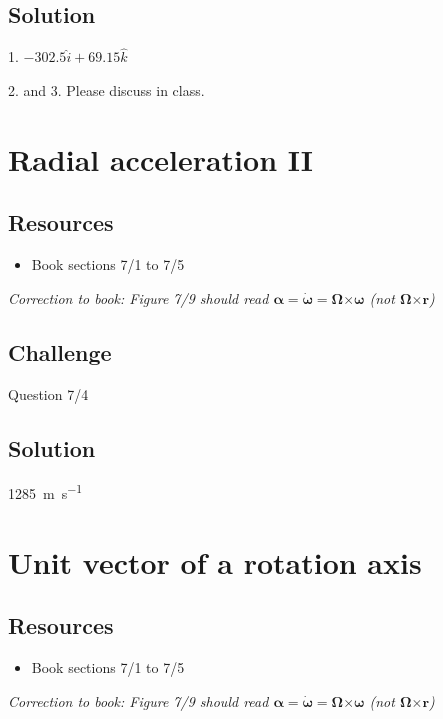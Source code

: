 \subsection*{Solution}
1. $-302.5 \hat{i} + 69.15 \hat{k}$

2. and 3. Please discuss in class.




\newpage
\section{Radial acceleration II}

\subsection*{Resources}
\begin{itemize}
    \item Book sections 7/1 to 7/5
\end{itemize}

\emph{Correction to book: Figure 7/9 should read $\bm{\alpha} = \bm{\dot{\omega}} = \bm{\Omega} \bm{\times} \bm{\omega}$ (not $\bm{\Omega} \bm{\times} \bm{r}$)}

\subsection*{Challenge}
Question 7/4

\subsection*{Solution}
\SI{1285}{\meter\per\second}




\newpage
\section{Unit vector of a rotation axis}

\subsection*{Resources}
\begin{itemize}
    \item Book sections 7/1 to 7/5
\end{itemize}

\emph{Correction to book: Figure 7/9 should read $\bm{\alpha} = \bm{\dot{\omega}} = \bm{\Omega} \bm{\times} \bm{\omega}$ (not $\bm{\Omega} \bm{\times} \bm{r}$)}
